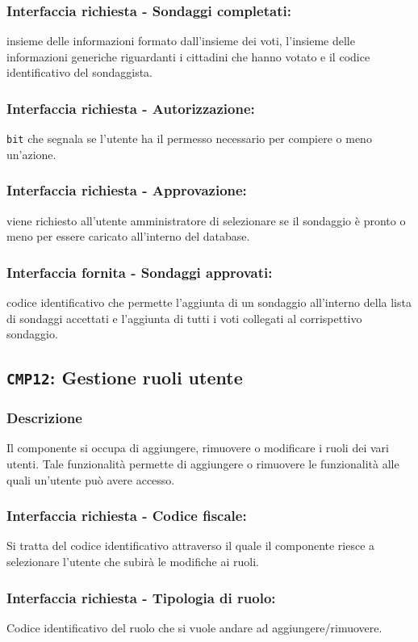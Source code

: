         \subsubsection{Interfaccia richiesta - Sondaggi completati:}
            insieme delle informazioni formato dall'insieme dei voti, l'insieme delle informazioni generiche riguardanti i cittadini che hanno votato e il codice identificativo del sondaggista.
        \subsubsection{Interfaccia richiesta - Autorizzazione:}
            \texttt{bit} che segnala se l'utente ha il permesso necessario per compiere o meno un'azione.
        \subsubsection{Interfaccia richiesta - Approvazione:}
            viene richiesto all'utente amministratore di selezionare se il sondaggio è pronto o meno per essere caricato all'interno del database.
        \subsubsection{Interfaccia fornita - Sondaggi approvati:}
            codice identificativo che permette l'aggiunta di un sondaggio all'interno della lista di sondaggi accettati e l'aggiunta di tutti i voti collegati al corrispettivo sondaggio.
    
    \subsection{\texttt{CMP12}: Gestione ruoli utente}
        \subsubsection{Descrizione}
            Il componente si occupa di aggiungere, rimuovere o modificare i ruoli dei vari utenti. Tale funzionalità permette di aggiungere o rimuovere le funzionalità alle quali un'utente può avere accesso. 
        \subsubsection{Interfaccia richiesta - Codice fiscale:}
            Si tratta del codice identificativo attraverso il quale il componente riesce a selezionare l'utente che subirà le modifiche ai ruoli.
        \subsubsection{Interfaccia richiesta - Tipologia di ruolo:}
            Codice identificativo del ruolo che si vuole andare ad aggiungere/rimuovere.

